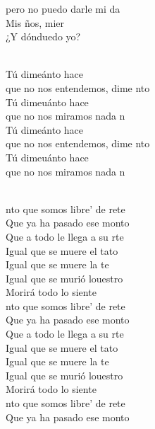 \begin{cancion}
	pero no puedo darle mi da\\
	Mis ños, mier\\
	¿Y dónduedo yo?\\\jump\\
	\begin{chorus}%
	Tú dimeánto hace \\
	que no nos entendemos, dime nto \\
	Tú dimeuánto hace  \\
	que no nos miramos nada n\\
	Tú dimeánto hace  \\
	que no nos entendemos, dime nto \\
	Tú dimeuánto hace  \\
	que no nos miramos nada n\\
	\end{chorus}%
	\jump\\
	nto que somos libre' de rete\\
	Que ya ha pasado ese monto\\
	Que a todo le llega a su rte\\
	Igual que se muere el tato\\
	Igual que se muere la te\\
	Igual que se murió louestro\\
	Morirá todo lo siente\\
\jump
	nto que somos libre' de rete\\
	Que ya ha pasado ese monto\\
	Que a todo le llega a su rte\\
	Igual que se muere el tato\\
	Igual que se muere la te\\
	Igual que se murió louestro\\
	Morirá todo lo siente\\
\jump
	nto que somos libre' de rete\\
	Que ya ha pasado ese monto\\

\end{cancion}
